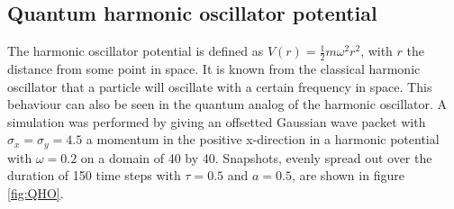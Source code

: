\subsection*{Quantum harmonic oscillator potential}
The harmonic oscillator potential is defined as $V(r) = \frac{1}{2}m\omega^2r^2$, with $r$ the distance from some point in space. It is known from the classical harmonic oscillator that a particle will oscillate with a certain frequency in space. This behaviour can also be seen in the quantum analog of the harmonic oscillator. A simulation was performed by giving an offsetted Gaussian wave packet with $\sigma_x = \sigma_y = 4.5$ a momentum in the positive x-direction in a harmonic potential with $\omega = 0.2$ on a domain of 40 by 40. Snapshots, evenly spread out over the duration of 150 time steps with $\tau = 0.5$ and $a = 0.5$, are shown in figure \ref{fig:QHO}.
\def\arraystretch{0.6}%
\setlength\tabcolsep{0.5mm}
